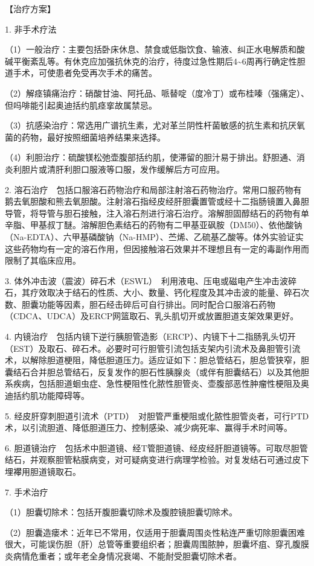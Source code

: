 【治疗方案】

1. 非手术疗法

（1）一般治疗：主要包括卧床休息、禁食或低脂饮食、输液、纠正水电解质和酸碱平衡紊乱等。有休克应加强抗休克的治疗，待度过急性期后4\textasciitilde{}6周再行确定性胆道手术，可使患者免受再次手术的痛苦。

（2）解痉镇痛治疗：硝酸甘油、阿托品、哌替啶（度冷丁）或布桂嗪（强痛定）、但吗啡能引起奥迪括约肌痉挛故属禁忌。

（3）抗感染治疗：常选用广谱抗生素，尤对革兰阴性杆菌敏感的抗生素和抗厌氧菌的药物，最好按照细菌培养结果来选择。

（4）利胆治疗：硫酸镁松弛壶腹部括约肌，使滞留的胆汁易于排出。舒胆通、消炎利胆片或清肝利胆口服液等口服，发作缓解后方可应用。

2.
溶石治疗　包括口服溶石药物治疗和局部注射溶石药物治疗。常用口服药物有鹅去氧胆酸和熊去氧胆酸。注射溶石指经皮经肝胆囊置管或经十二指肠镜置入鼻胆导管，将导管与胆石接触，注入溶石剂进行溶石治疗。溶解胆固醇结石的药物有单辛脂、甲基叔丁醚。溶解胆色素结石的药物有二甲基亚砜胺（DM50）、依他酸钠（Na-EDTA）、六甲基磷酸钠（Na-HMP）、苎烯、乙硫基乙酸等。体外实验证实这些药物均有一定的溶石作用，但因接触溶石效果并不理想且有一定的毒副作用而限制了其临床应用。

3.
体外冲击波（震波）碎石术（ESWL）　利用液电、压电或磁电产生冲击波碎石，其疗效取决于结石的性质、大小、数量、钙化程度及其冲击波的能量、碎石次数、胆囊功能等因素，胆石经击碎后可自行排出。同时配合口服溶石药物（CDCA、UDCA）及ERCP网篮取石、乳头肌切开或放置胆道支架效果更好。

4.
内镜治疗　包括内镜下逆行胰胆管造影（ERCP）、内镜下十二指肠乳头切开（EST）及取石、碎石术。必要时可行胆管引流包括支架内引流术及鼻胆管引流术，以解除胆道梗阻，降低胆道压力。适应证如下：胆总管结石，胆总管狭窄，胆囊结石合并胆总管结石，反复发作的胆石性胰腺炎（或伴有胆囊结石）以及其他胆系疾病，包括胆道蛔虫症、急性梗阻性化脓性胆管炎、壶腹部恶性肿瘤性梗阻及奥迪括约肌功能障碍等。

5.
经皮肝穿刺胆道引流术（PTD）　对胆管严重梗阻或化脓性胆管炎者，可行PTD术，以引流胆道、降低胆道压力、控制感染、减少病死率、赢得手术时间等。

6.
胆道镜治疗　包括术中胆道镜、经T管胆道镜、经皮经肝胆道镜等。可取尽胆管结石，并观察胆管粘膜病变，对可疑病变进行病理学检验。对复发结石可通过皮下埋襻用胆道镜取石。

7. 手术治疗

（1）胆囊切除术：包括开腹胆囊切除术及腹腔镜胆囊切除术。

（2）胆囊造瘘术：近年已不常用，仅适用于胆囊周围炎性粘连严重切除胆囊困难很大，可能误伤胆（肝）总管等重要组织者；胆囊周围脓肿，胆囊坏疽、穿孔腹膜炎病情危重者；或年老全身情况衰竭、不能耐受胆囊切除术者。

